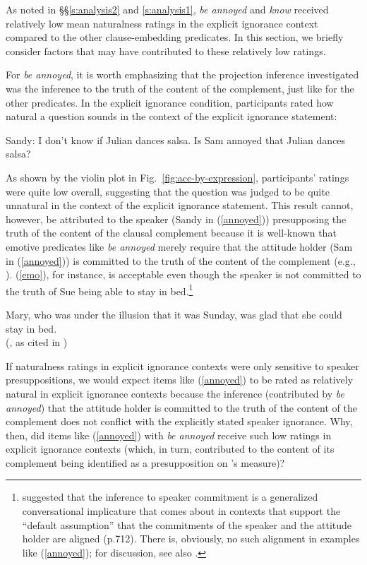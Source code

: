 \documentclass[11pt,fleqn]{article}
\newcommand{\6}{\mbox{$[\hspace*{-.6mm}[$}}
\newcommand{\9}{\mbox{$]\hspace*{-.6mm}]$}}
\newcommand{\citepos}[1]{\citeauthor{#1}'s \citeyear{#1}}
\begin{document}
As noted in \S\S \ref{s:analysis2} and \ref{s:analysis1}, \emph{be annoyed} and \emph{know} received relatively low mean naturalness ratings in the explicit ignorance context compared to the other clause-embedding predicates. In this section, we briefly consider factors that may have contributed to these relatively low ratings. 

For \emph{be annoyed}, it is worth emphasizing that the projection inference investigated was the inference to the truth of the content of the complement, just like for the other predicates. In the explicit ignorance condition, participants rated how natural a question sounds in the context of the explicit ignorance statement:

\begin{exe}
\ex\label{annoyed} Sandy: I don't know if Julian dances salsa. Is Sam annoyed that Julian dances salsa?
\end{exe}
As shown by the violin plot in Fig.~\ref{fig:acc-by-expression}, participants' ratings were quite low overall, suggesting that the question was judged to be quite unnatural in the context of the explicit ignorance statement. This result cannot, however, be attributed to the speaker (Sandy in (\ref{annoyed})) presupposing the truth of the content of the clausal complement because it is well-known that emotive predicates like \emph{be annoyed} merely require that the attitude holder (Sam in (\ref{annoyed})) is committed to the truth of the content of the complement (e.g., \citealt{heim92,karttunen2016,djaerv2019-thesis}). (\ref{emo}), for instance, is acceptable even though the speaker is not committed to the truth of Sue being able to stay in bed.\footnote{\citealt{karttunen2016} suggested that the inference to speaker commitment is a generalized conversational implicature that comes about in contexts that support the ``default assumption'' that the commitments of the speaker and the attitude holder are aligned (p.712). There is, obviously, no such alignment in examples like (\ref{annoyed}); for discussion, see also \citealt{djaerv2019-thesis}.}

\begin{exe}
\ex\label{emo} 
Mary, who was under the illusion that it was Sunday, was glad that she could stay in bed. \\ \hspace*{.2cm} \hfill (\citealt{klein1975}, as cited in \citealt[122]{gazdar79a})
\end{exe}
If naturalness ratings in explicit ignorance contexts were only sensitive to speaker presuppositions, we would expect items like (\ref{annoyed}) to be rated as relatively natural in explicit ignorance contexts because the inference (contributed by \emph{be annoyed}) that the attitude holder is committed to the truth of the content of the complement does not conflict with the explicitly stated speaker ignorance. Why, then, did items like (\ref{annoyed}) with \emph{be annoyed} receive such low  ratings in explicit ignorance contexts (which, in turn, contributed to the content of its complement being identified as a presupposition on \citepos{mandelkern-etal2020} measure)? 
\end{document}
